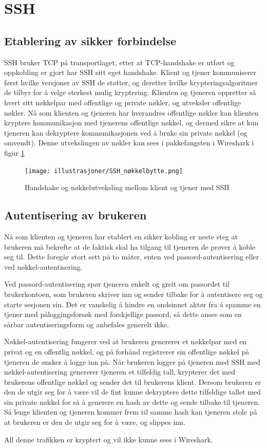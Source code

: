 \documentclass{article}
\begin{document}
\section{SSH}

\subsection{Etablering av sikker forbindelse}

SSH bruker TCP på transportlaget, etter at TCP-handshake er utført og oppkobling er gjort har SSH sitt eget handshake. Klient og tjener kommuniserer først hvilke versjoner av SSH de støtter, og deretter hvilke krypteringsalgoritmer de tilbyr for å velge sterkest mulig kryptering. Klienten og tjeneren oppretter så hvert sitt nøkkelpar med offentlige og private nøkler, og utveksler offentlige nøkler. Nå som klienten og tjeneren har hverandres offentlige nøkler kan klienten kryptere kommunikasjon med tjenerens offentlige nøkkel, og dermed sikre at kun tjeneren kan dekryptere kommunikasjonen ved å bruke sin private nøkkel (og omvendt). Denne utvekslingen av nøkler kan sees i pakkefangsten i Wireshark i figur \ref*{fig:SSH_nøkler}

\begin{figure}[h]
    \centering
    \texttt{[image: illustrasjoner/SSH\_nøkkelbytte.png]}
    \caption{Handshake og nøkkelutveksling mellom klient og tjener med SSH}
    \label{fig:SSH_nøkler}
\end{figure}

\subsection{Autentisering av brukeren}

Nå som klienten og tjeneren har etablert en sikker kobling er neste steg at brukeren må bekrefte at de faktisk skal ha tilgang til tjeneren de prøver å koble seg til. Dette foregår stort sett på to måter, enten ved passord-autentisering eller ved nøkkel-autentisering.

Ved passord-autentisering spør tjeneren enkelt og greit om passordet til brukerkontoen, som brukeren skriver inn og sender tilbake for å autentisere seg og starte sesjonen sin. Det er vanskelig å hindre en ondsinnet aktør fra å spamme en tjener med påloggingsforsøk med forskjellige passord, så dette anses som en sårbar autentiseringsform og anbefales generelt ikke.

Nøkkel-autentisering fungerer ved at brukeren genererer et nøkkelpar med en privat og en offentlig nøkkel, og på forhånd registrerer sin offentlige nøkkel på tjeneren de ønsker å logge inn på. Når brukeren logger på tjeneren med SSH med nøkkel-autentisering genererer tjeneren et tilfeldig tall, krypterer det med brukerens offentlige nøkkel og sender det til brukerens klient. Dersom brukeren er den de utgir seg for å være vil de fint kunne dekryptere dette tilfeldige tallet med sin private nøkkel for så å generere en hash av dette og sende tilbake til tjeneren. Så lenge klienten og tjeneren kommer frem til samme hash kan tjeneren stole på at brukeren er den de utgir seg for å være, og slippes inn.

All denne trafikken er kryptert og vil ikke kunne sees i Wireshark.
\end{document}
